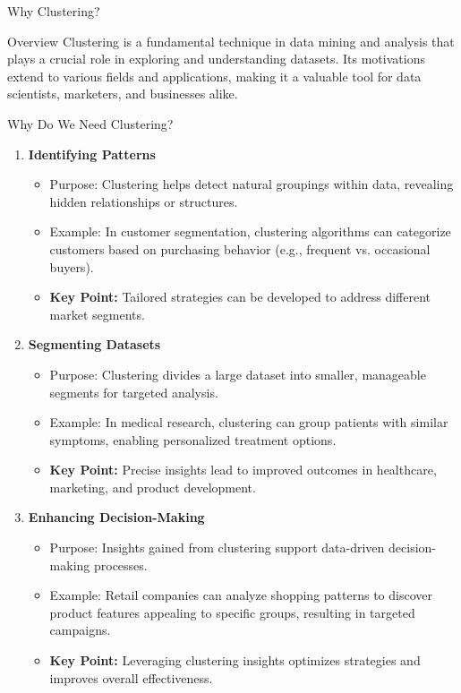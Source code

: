 \documentclass[aspectratio=169]{beamer}
\begin{document}
\begin{frame}[fragile]{Why Clustering?}
    \begin{block}{Overview}
        Clustering is a fundamental technique in data mining and analysis that plays a crucial role in exploring and understanding datasets. Its motivations extend to various fields and applications, making it a valuable tool for data scientists, marketers, and businesses alike.
    \end{block}
\end{frame}

\begin{frame}[fragile]{Why Do We Need Clustering?}
    \begin{enumerate}
        \item \textbf{Identifying Patterns}
        \begin{itemize}
            \item Purpose: Clustering helps detect natural groupings within data, revealing hidden relationships or structures.
            \item Example: In customer segmentation, clustering algorithms can categorize customers based on purchasing behavior (e.g., frequent vs. occasional buyers).
            \item \textbf{Key Point:} Tailored strategies can be developed to address different market segments.
        \end{itemize}

        \item \textbf{Segmenting Datasets}
        \begin{itemize}
            \item Purpose: Clustering divides a large dataset into smaller, manageable segments for targeted analysis.
            \item Example: In medical research, clustering can group patients with similar symptoms, enabling personalized treatment options.
            \item \textbf{Key Point:} Precise insights lead to improved outcomes in healthcare, marketing, and product development.
        \end{itemize}
        
        \item \textbf{Enhancing Decision-Making}
        \begin{itemize}
            \item Purpose: Insights gained from clustering support data-driven decision-making processes.
            \item Example: Retail companies can analyze shopping patterns to discover product features appealing to specific groups, resulting in targeted campaigns.
            \item \textbf{Key Point:} Leveraging clustering insights optimizes strategies and improves overall effectiveness.
        \end{itemize}
    \end{enumerate}
\end{frame}
\end{document}
